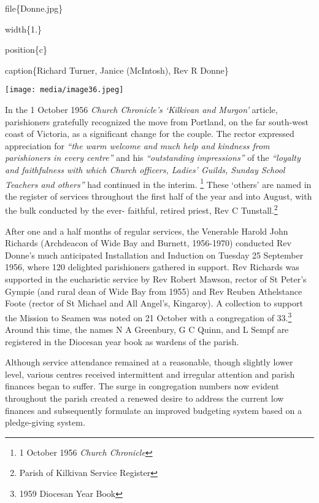 file\{Donne.jpg\}

width\{1.\}

position\{c\}

caption\{Richard Turner, Janice (McIntosh), Rev R Donne\}

\texttt{[image: media/image36.jpeg]}

In the 1 October 1956 \emph{Church Chronicle's `Kilkivan and Murgon'} article, parishioners gratefully recognized the move from Portland, on the far south-west coast of Victoria, as a significant change for the couple. The rector expressed appreciation for \emph{``the warm welcome and much help and kindness from parishioners in every centre''} and his \emph{``outstanding impressions''} of the \emph{``loyalty and faithfulness with which Church officers, Ladies' Guilds, Sunday School Teachers and others''} had continued in the interim. \footnote{1 October 1956 \emph{Church Chronicle}} These `others' are named in the register of services throughout the first half of the year and into August, with the bulk conducted by the ever- faithful, retired priest, Rev C Tunstall.\footnote{Parish of Kilkivan Service Register}

After one and a half months of regular services, the Venerable Harold John Richards (Archdeacon of Wide Bay and Burnett, 1956-1970) conducted Rev Donne's much anticipated Installation and Induction on Tuesday 25 September 1956, where 120 delighted parishioners gathered in support. Rev Richards was supported in the eucharistic service by Rev Robert Mawson, rector of St Peter's Gympie (and rural dean of Wide Bay from 1955) and Rev Reuben Athelstance Foote (rector of St Michael and All Angel's, Kingaroy). A collection to support the Mission to Seamen was noted on 21 October with a congregation of 33.\footnote{1959 Diocesan Year Book} Around this time, the names N A Greenbury, G C Quinn, and L Sempf are registered in the Diocesan year book as wardens of the parish.

Although service attendance remained at a reasonable, though slightly lower level, various centres received intermittent and irregular attention and parish finances began to suffer. The surge in congregation numbers now evident throughout the parish created a renewed desire to address the current low finances and subsequently formulate an improved budgeting system based on a pledge-giving system.

